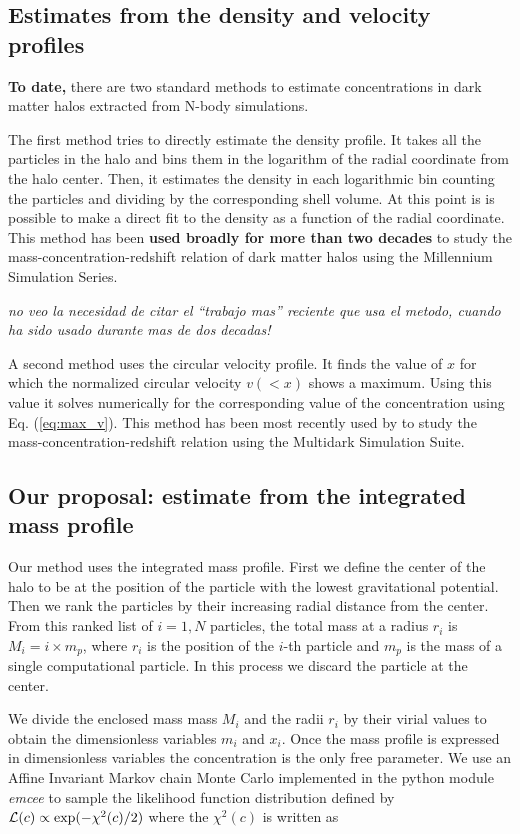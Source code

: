 \documentclass[a4,useAMS,usenatbib,usegraphicx]{mn2e}
\begin{document}
\subsection{Estimates from the density and velocity profiles}
{\bf To date,} there are two standard methods to estimate
concentrations in dark matter halos extracted from N-body simulations.

The first method tries to directly estimate the density profile.  It
takes all the particles in the halo and bins them in the logarithm of
the radial coordinate from the halo center.  Then, it estimates the
density in each logarithmic bin counting the particles and dividing by
the corresponding shell volume.  At this point is is possible to make
a direct fit to the density as a function of the radial coordinate.
This method has been {\bf used broadly for more than two decades} to
study the mass-concentration-redshift relation of dark matter halos
using the Millennium Simulation Series.

{\it no veo la necesidad de citar el ``trabajo mas'' reciente que usa
  el metodo, cuando ha sido usado durante mas de dos decadas!}
 
A second method uses the circular velocity profile.  It finds the
value of $x$ for which the normalized circular velocity $v(<x)$ shows
a maximum.  Using this value it solves numerically for the
corresponding value of the concentration using Eq. (\ref{eq:max_v}).
This method has been most recently used by \cite{Klypin2014} to study
the mass-concentration-redshift relation using the Multidark
Simulation Suite.


\subsection{Our proposal: estimate from the integrated mass profile}
Our method uses the integrated mass profile.  First we define the
center of the halo to be at the position of the particle with the
lowest gravitational potential.  Then we rank the particles by their
increasing radial distance from the center.  From this ranked list of
$i=1,N$ particles, the total mass at a radius $r_i$ is $M_i=i\times
m_p$, where $r_i$ is the position of the $i$-th particle and $m_p$ is
the mass of a single computational particle. In this process we
discard the particle at the center.

We divide the enclosed mass mass $M_i$ and the radii $r_i$ by their
virial values to obtain the dimensionless variables $m_i$ and $x_i$.
Once the mass profile is expressed in dimensionless variables the
concentration is the only free parameter. We use an Affine Invariant
Markov chain Monte Carlo implemented in the python module {\em emcee}
\citep{emcee} to sample the likelihood function distribution defined
by ${\cal L}(c)\propto \exp(-\chi^2(c)/2)$ where the $\chi^2(c)$ is
written as
\end{document}

